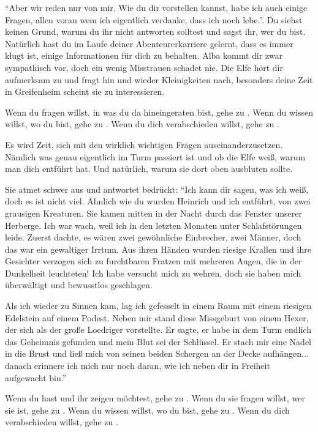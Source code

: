 ``Aber wir reden nur von mir. Wie du dir vorstellen kannst, habe ich auch einige Fragen, allen voran wem ich eigentlich verdanke, dass ich noch lebe.''. Du siehst keinen Grund, warum du ihr nicht antworten solltest und sagst ihr, wer du bist. Natürlich hast du im Laufe deiner Abenteurerkarriere gelernt, dass es immer klugt ist, einige Informationen für dich zu behalten. Alba kommt dir zwar sympathisch vor, doch ein wenig Misstrauen schadet nie. Die Elfe hört dir aufmerksam zu und fragt hin und wieder Kleinigkeiten nach, besonders deine Zeit in Greifenheim scheint sie zu interessieren.

Wenn du fragen willst, in was du da hineingeraten bist, gehe zu . Wenn du wissen willst, wo du bist, gehe zu .
Wenn du dich verabschieden willst, gehe zu .


Es wird Zeit, sich mit den wirklich wichtigen Fragen auseinanderzusetzen. Nämlich was genau eigentlich im Turm passiert ist und ob die Elfe weiß, warum man dich entführt hat. Und natürlich, warum sie dort oben ausbluten sollte.

Sie atmet schwer aus und antwortet bedrückt: ``Ich kann dir sagen, was ich weiß, doch es ist nicht viel. Ähnlich wie du wurden Heinrich und ich entführt, von zwei grausigen Kreaturen. Sie kamen mitten in der Nacht durch das Fenster unserer Herberge. Ich war wach, weil ich in den letzten Monaten unter Schlafstörungen leide. Zuerst dachte, es wären zwei gewöhnliche Einbrecher, zwei Männer, doch das war ein gewaltiger Irrtum. Aus ihren Händen wurden riesige Krallen und ihre Gesichter verzogen sich zu furchtbaren Fratzen mit mehreren Augen, die in der Dunkelheit leuchteten! Ich habe versucht mich zu wehren, doch sie haben mich überwältigt und bewusstlos geschlagen.

Als ich wieder zu Sinnen kam, lag ich gefesselt in einem Raum mit einem riesigen Edelstein auf einem Podest. Neben mir stand diese Missgeburt von einem Hexer, der sich als der große Loedriger vorstellte. Er sagte, er habe in dem Turm endlich das Geheimnis gefunden und mein Blut sei der Schlüssel. Er stach mir eine Nadel in die Brust und ließ mich von seinen beiden Schergen an der Decke aufhängen... danach erinnere ich mich nur noch daran, wie ich neben dir in Freiheit aufgewacht bin.''

Wenn du  hast und ihr zeigen möchtest, gehe zu .
Wenn du sie fragen willst, wer sie ist, gehe zu . Wenn du wissen willst, wo du bist, gehe zu .
Wenn du dich verabschieden willst, gehe zu .

